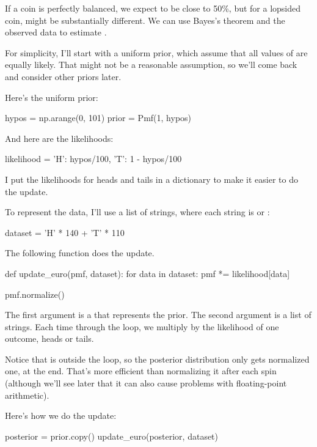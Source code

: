\documentclass[12pt]{book}
\theoremstyle{exercise}
\begin{document}
If a coin is perfectly balanced, we expect  to be close to 50\%, but
for a lopsided coin,  might be substantially different.  We can use
Bayes's theorem and the observed data to estimate .

For simplicity, I'll start with a uniform prior, which assume that all values of  are equally likely.
That might not be a reasonable assumption, so we'll come back and consider other priors later.

Here's the uniform prior:

\begin{code}
hypos = np.arange(0, 101)
prior = Pmf(1, hypos)
\end{code}

And here are the likelihoods:

\begin{code}
likelihood = {
    'H': hypos/100,
    'T': 1 - hypos/100
}
\end{code}

I put the likelihoods for heads and tails in a dictionary to make it easier to do the update.

To represent the data, I'll use a list of strings, where each string is  or :

\begin{code}
dataset = 'H' * 140 + 'T' * 110
\end{code}

The following function does the update.

\begin{code}
def update_euro(pmf, dataset):
    for data in dataset:
        pmf *= likelihood[data]

    pmf.normalize()
\end{code}

The first argument is a  that represents the prior.
The second argument is a list of strings.
Each time through the loop, we multiply  by the likelihood of one outcome, heads or tails.

Notice that  is outside the loop, so the posterior distribution only gets normalized one, at the end.
That's more efficient than normalizing it after each spin (although we'll see later that it can also cause problems with floating-point arithmetic).

Here's how we do the update:

\begin{code}
posterior = prior.copy()
update_euro(posterior, dataset)
\end{code}
\end{document}
